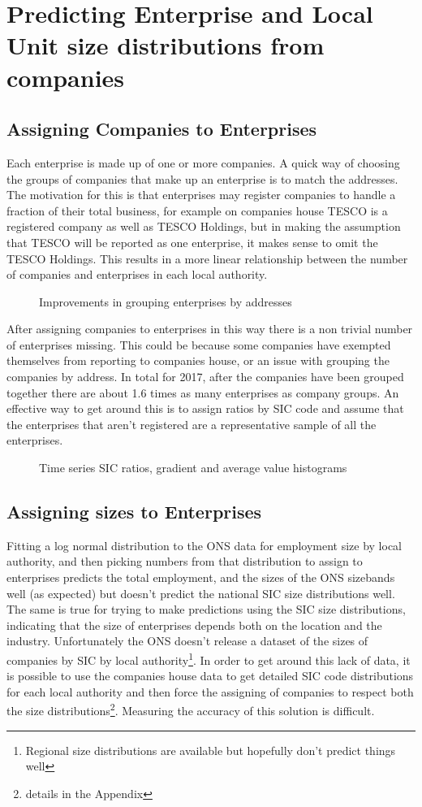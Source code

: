 \documentclass[a4paper,10pt]{article}
\begin{document}
\section{Predicting Enterprise and Local Unit size distributions from companies}
\subsection{Assigning Companies to Enterprises}
Each enterprise is made up of one or more companies. A quick way of choosing the groups of companies that make up an enterprise is to match the addresses. The motivation for this is that enterprises may register companies to handle a fraction of their total business, for example on companies house TESCO is a registered company as well as TESCO Holdings, but in making the assumption that TESCO will be reported as one enterprise, it makes sense to omit the TESCO Holdings. This results in a more linear relationship between the number of companies and enterprises in each local authority.
\begin{figure}[!ht]
 \caption{Improvements in grouping enterprises by addresses}
\end{figure}

After assigning companies to enterprises in this way there is a non trivial number of enterprises missing. This could be because some companies have exempted themselves from reporting to companies house, or an issue with grouping the companies by address. In total for 2017, after the companies have been grouped together there are about 1.6 times as many enterprises as company groups. An effective way to get around this is to assign ratios by SIC code and assume that the enterprises that aren't registered are a representative sample of all the enterprises.
\begin{figure}[!ht]
 \caption{Time series SIC ratios, gradient and average value histograms}
\end{figure}


\subsection{Assigning sizes to Enterprises}
\label{enterprise_sizes}
Fitting a log normal distribution to the ONS data for employment size by local authority, and then picking numbers from that distribution to assign to enterprises predicts the total employment, and the sizes of the ONS sizebands well (as expected) but doesn't predict the national SIC size distributions well. The same is true for trying to make predictions using the SIC size distributions, indicating that the size of enterprises depends both on the location and the industry. Unfortunately the ONS doesn't release a dataset of the sizes of companies by SIC by local authority\footnote{Regional size distributions are available but hopefully don't predict things well}. In order to get around this lack of data, it is possible to use the companies house data to get detailed SIC code distributions for each local authority and then force the assigning of companies to respect both the size distributions\footnote{details in the Appendix}. Measuring the accuracy of this solution is difficult.
\end{document}
